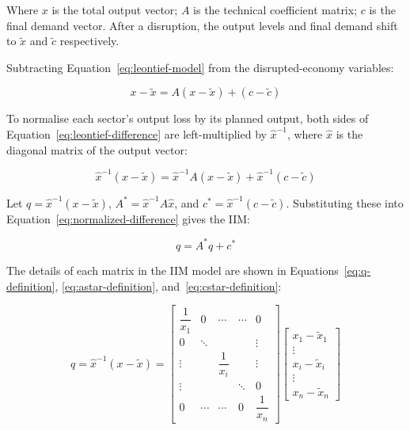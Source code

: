 Where $x$ is the total output vector; $A$ is the technical coefficient matrix; $c$ is the final demand vector. After a disruption, the output levels and final demand shift to $\tilde{x}$ and $\tilde{c}$ respectively.

Subtracting Equation~\eqref{eq:leontief-model} from the disrupted-economy variables:

\begin{equation}
    x - \tilde{x} = A (x - \tilde{x}) + (c - \tilde{c})
    \label{eq:leontief-difference}
\end{equation}

To normalise each sector's output loss by its planned output, both sides of Equation~\eqref{eq:leontief-difference} are left-multiplied by $\hat{x}^{-1}$, where $\hat{x}$ is the diagonal matrix of the output vector:

\begin{equation}
    \hat{x}^{-1}(x - \tilde{x}) = \hat{x}^{-1}A(x - \tilde{x}) + \hat{x}^{-1}(c - \tilde{c})
    \label{eq:normalized-difference}
\end{equation}

Let $q = \hat{x}^{-1}\left(x - \tilde{x}\right)$, $A^{*} = \hat{x}^{-1} A \hat{x}$, and $c^{*} = \hat{x}^{-1}\left(c - \tilde{c}\right)$. Substituting these into Equation~\eqref{eq:normalized-difference} gives the IIM:

\begin{equation}
    q = A^{*} q + c^{*}
    \label{eq:iim-model}
\end{equation}

The details of each matrix in the IIM model are shown in Equations~\eqref{eq:q-definition}, \eqref{eq:astar-definition}, and~\eqref{eq:cstar-definition}:

\begin{equation}
    \label{eq:q-definition}
    q = \hat{x}^{-1} (x - \tilde{x}) =
    \begin{bmatrix}
        \dfrac{1}{x_1} & 0 & \cdots & \cdots & 0 \\
        0 & \ddots & & & \vdots \\
        \vdots & & \dfrac{1}{x_i} & & \vdots \\
        \vdots & & & \ddots & 0 \\
        0 & \cdots & \cdots & 0 & \dfrac{1}{x_n}
    \end{bmatrix}
    \begin{bmatrix}
        x_1 - \tilde{x}_1 \\
        \vdots \\
        x_i - \tilde{x}_i \\
        \vdots \\
        x_n - \tilde{x}_n
    \end{bmatrix}
\end{equation}

